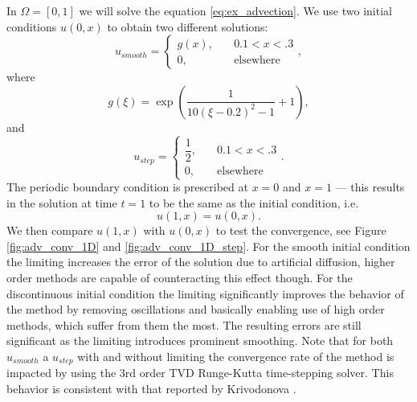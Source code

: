 \begin{example}[Advection 1D]
\label{ex:adv1D}
In $\Omega = [0, 1]$ we will solve the equation \eqref{eq:ex_advection}.
We use two initial conditions $u(0, x)$ to obtain two different solutions:
\begin{equation}
u_{smooth} = \begin{cases}
g(x),\quad &0.1 < x < .3\\
0, \quad &\text{elsewhere}
\end{cases},
\end{equation}
where
\begin{equation}
g(\xi) = \exp\left(\frac{1}{10(\xi - 0.2)^2 - 1}+ 1\right),
\end{equation}
and
\begin{equation}
u_{step} = \begin{cases}
\dfrac{1}{2},\quad &0.1 < x < .3\\
0, \quad &\text{elsewhere}
\end{cases}.
\end{equation}
The periodic boundary condition is prescribed at $x = 0$ and $x = 1$ --- this
results in the solution at time $t = 1$ to be the same as the initial condition,
i.e.
\begin{equation}
u(1, x) = u(0, x).
\end{equation}
We then compare $u(1, x)$ with $u(0, x)$ to test the convergence, see Figure
\ref{fig:adv_conv_1D} and \ref{fig:adv_conv_1D_step}. For the smooth initial condition
the limiting increases the error of the solution due to artificial diffusion, higher order
methods are capable of counteracting this effect though. For the discontinuous initial
condition the limiting significantly improves the behavior of the method by removing oscillations
and basically enabling use of high order methods, which suffer from them the most. The
resulting errors are still significant as the limiting introduces prominent
smoothing. Note that for both $u_{smooth}$ a $u_{step}$ with and without limiting the
convergence rate of the method is impacted by using the 3rd order TVD Runge-Kutta
time-stepping solver. This behavior is consistent with that reported by Krivodonova
\cite{Krivodonova2007}.

\end{example}
